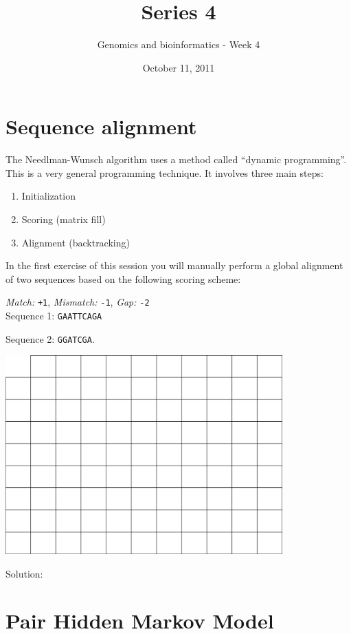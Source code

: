 \documentclass[a4paper,11pt]{article}
\title{Series 4}
\date{October 11, 2011}
\author{Genomics and bioinformatics - Week 4}
\begin{document}
\maketitle

\section{Sequence alignment}
The Needlman-Wunsch algorithm uses a method called ``dynamic programming''. This is a very general programming technique. It involves three main steps:
\begin{enumerate}
\item Initialization
\item Scoring (matrix fill)
\item Alignment (backtracking)
\end{enumerate}

In the first exercise of this session you will manually perform a global alignment of two sequences based on the following scoring scheme:

\emph{Match:} \texttt{+1}, \emph{Mismatch:} \texttt{-1}, \emph{Gap:} \texttt{-2}\\

Sequence 1: \texttt{GAATTCAGA}

Sequence 2: \texttt{GGATCGA}.

\vspace{0.5cm}

\begin{center}
\includegraphics[width=0.8\textwidth]{matrix.png}
\end{center}

Solution:\\

\section{Pair Hidden Markov Model}
\end{document}
